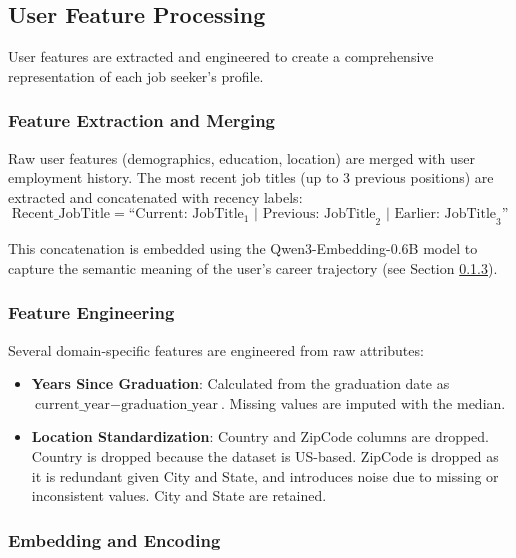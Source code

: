 \subsection{User Feature Processing}
\label{sec:user_features_processing}

User features are extracted and engineered to create a comprehensive representation of each job seeker's profile.

\subsubsection{Feature Extraction and Merging}

Raw user features (demographics, education, location) are merged with user employment history. The most recent job titles (up to 3 previous positions) are extracted and concatenated with recency labels:
\begin{equation}
\text{Recent\_JobTitle} = \text{``Current: JobTitle}_{1}\text{ | Previous: JobTitle}_{2}\text{ | Earlier: JobTitle}_{3}\text{''}
\end{equation}

This concatenation is embedded using the Qwen3-Embedding-0.6B model to capture the semantic meaning of the user's career trajectory (see Section \ref{sec:user_embedding}).

\subsubsection{Feature Engineering}

Several domain-specific features are engineered from raw attributes:

\begin{itemize}
    \item \textbf{Years Since Graduation}: Calculated from the graduation date as $\text{current\_year} - \text{graduation\_year}$. Missing values are imputed with the median.
    \item \textbf{Location Standardization}: Country and ZipCode columns are dropped. Country is dropped because the dataset is US-based. ZipCode is dropped as it is redundant given City and State, and introduces noise due to missing or inconsistent values. City and State are retained.
\end{itemize}

\subsubsection{Embedding and Encoding}
\label{sec:user_embedding}


